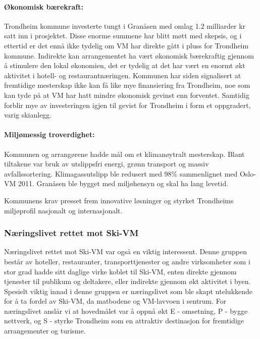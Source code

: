 \paragraph{Økonomisk bærekraft:} Trondheim kommune investerte tungt i Granåsen med omlag 1.2
milliarder kr satt inn i prosjektet\cite{NRK12Milliarder}. Disse enorme summene har blitt møtt med skepsis,
og i ettertid er det ennå ikke tydelig om VM har direkte gått i pluss for Trondheim kommune\cite{AftenpostenNyVM}.
Indirekte kan arrangementet ha vært økonomisk bærekraftig gjennom å stimulere den lokal
økonomien, det er tydelig at det har vært en enormt økt aktivitet i hotell- og
restaurantnæringen\cite{DagbladetPriser}. Kommunen har siden signalisert at fremtidige mesterskap ikke
kan få like mye finansiering fra Trondheim\cite{NeaRadioVM}, noe som kan tyde på at VM har hatt mindre økonomisk
gevinst enn forventet. Samtidig forblir mye av investeringen igjen til gevist for Trondheim i form
et oppgradert, varig skianlegg.

\paragraph{Miljømessig troverdighet:} Kommunen og arrangørene hadde mål om et klimanøytralt
mesterskap\cite{TrondheimKommuneVM}. Blant tiltakene var bruk av utslippsfri energi, grønn
transport og massiv avfallssortering. Klimagassutslipp ble redusert med 98\% sammenlignet
med Oslo-VM 2011\cite{Trondheim2025Kutt}. Granåsen ble bygget med miljøhensyn og skal ha lang levetid.

Kommunens krav presset frem innovative løsninger og styrket Trondheims
miljøprofil nasjonalt og internasjonalt.

\subsubsection{Næringslivet rettet mot Ski-VM}
Næringslivet rettet mot Ski-VM var også en viktig interessent. Denne gruppen består av
hoteller, restauranter, transporttjenester og andre virksomheter som i stor grad hadde sitt
daglige virke koblet til Ski-VM, enten direkte gjennom tjenester til publikum og deltakere,
eller indirekte gjennom økt aktivitet i byen. Spesielt viktig innad i denne gruppen er
næringslivet som ble skapt utelukkende for å ta fordel av Ski-VM, da matbodene og VM-lavvoen
i sentrum. For næringslivet anslår vi at hovedmålet var å oppnå økt E - omsetning, P - bygge nettverk, og
S - styrke Trondheim som en attraktiv destinasjon for fremtidige arrangementer og turisme.



